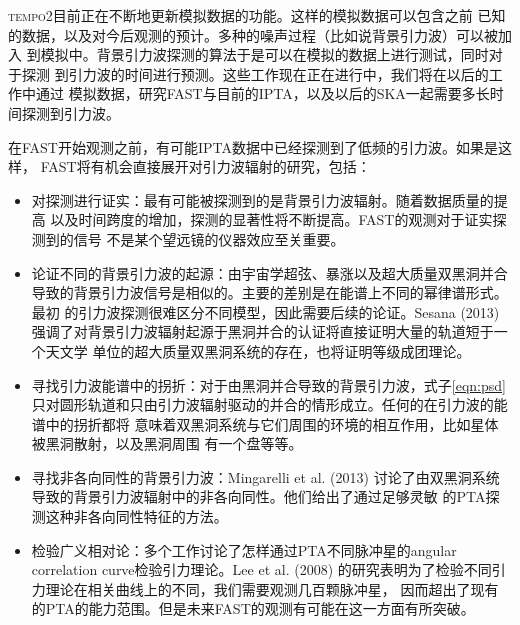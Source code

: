 \textsc{tempo2}目前正在不断地更新模拟数据的功能。这样的模拟数据可以包含之前
已知的数据，以及对今后观测的预计。多种的噪声过程（比如说背景引力波）可以被加入
到模拟中。背景引力波探测的算法于是可以在模拟的数据上进行测试，同时对于探测
到引力波的时间进行预测。这些工作现在正在进行中，我们将在以后的工作中通过
模拟数据，研究FAST与目前的IPTA，以及以后的SKA一起需要多长时间探测到引力波。

在FAST开始观测之前，有可能IPTA数据中已经探测到了低频的引力波。如果是这样，
FAST将有机会直接展开对引力波辐射的研究，包括：
\begin{itemize}
\item 对探测进行证实：最有可能被探测到的是背景引力波辐射。随着数据质量的提高
以及时间跨度的增加，探测的显著性将不断提高。FAST的观测对于证实探测到的信号
不是某个望远镜的仪器效应至关重要。
\item 论证不同的背景引力波的起源：由宇宙学超弦、暴涨以及超大质量双黑洞并合
导致的背景引力波信号是相似的。主要的差别是在能谱上不同的幂律谱形式。最初
的引力波探测很难区分不同模型，因此需要后续的论证。Sesana (2013)\supercite{ses13}
强调了对背景引力波辐射起源于黑洞并合的认证将直接证明大量的轨道短于一个天文学
单位的超大质量双黑洞系统的存在，也将证明等级成团理论。
\item 寻找引力波能谱中的拐折：对于由黑洞并合导致的背景引力波，式子\ref{eqn:psd}
只对圆形轨道和只由引力波辐射驱动的并合的情形成立。任何的在引力波的能谱中的拐折都将
意味着双黑洞系统与它们周围的环境的相互作用，比如星体被黑洞散射，以及黑洞周围
有一个盘等等\supercite{rws+14}。
\item 寻找非各向同性的背景引力波：Mingarelli et al. (2013)\supercite{msmv13}
讨论了由双黑洞系统导致的背景引力波辐射中的非各向同性。他们给出了通过足够灵敏
的PTA探测这种非各向同性特征的方法。
\item 检验广义相对论：多个工作讨论了怎样通过PTA不同脉冲星的angular correlation
curve检验引力理论\supercite{lee13,ljp+08,ljp+10}。Lee et al. (2008)\supercite{ljp+08}
的研究表明为了检验不同引力理论在相关曲线上的不同，我们需要观测几百颗脉冲星，
因而超出了现有的PTA的能力范围。但是未来FAST的观测有可能在这一方面有所突破。
\end{itemize}


